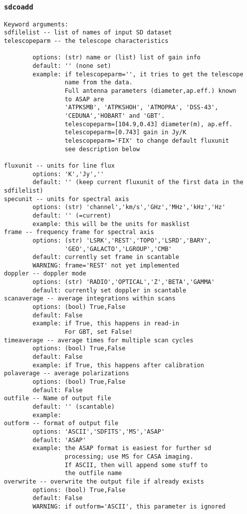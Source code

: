 \subsubsection{{\tt sdcoadd}}
\label{section:sd.sdtasks.tasks.sdcoadd}

\begin{verbatim}
Keyword arguments:
sdfilelist -- list of names of input SD dataset
telescopeparm -- the telescope characteristics

        options: (str) name or (list) list of gain info
        default: '' (none set)
        example: if telescopeparm='', it tries to get the telescope
                 name from the data.
                 Full antenna parameters (diameter,ap.eff.) known
                 to ASAP are
                 'ATPKSMB', 'ATPKSHOH', 'ATMOPRA', 'DSS-43',
                 'CEDUNA','HOBART' and 'GBT'.
                 telescopeparm=[104.9,0.43] diameter(m), ap.eff.
                 telescopeparm=[0.743] gain in Jy/K
                 telescopeparm='FIX' to change default fluxunit
                 see description below

fluxunit -- units for line flux
        options: 'K','Jy',''
        default: '' (keep current fluxunit of the first data in the sdfilelist)
specunit -- units for spectral axis
        options: (str) 'channel','km/s','GHz','MHz','kHz','Hz'
        default: '' (=current)
        example: this will be the units for masklist
frame -- frequency frame for spectral axis
        options: (str) 'LSRK','REST','TOPO','LSRD','BARY',
                 'GEO','GALACTO','LGROUP','CMB'
        default: currently set frame in scantable
        WARNING: frame='REST' not yet implemented
doppler -- doppler mode
        options: (str) 'RADIO','OPTICAL','Z','BETA','GAMMA'
        default: currently set doppler in scantable
scanaverage -- average integrations within scans
        options: (bool) True,False
        default: False
        example: if True, this happens in read-in
                 For GBT, set False!
timeaverage -- average times for multiple scan cycles
        options: (bool) True,False
        default: False
        example: if True, this happens after calibration
polaverage -- average polarizations
        options: (bool) True,False
        default: False
outfile -- Name of output file
        default: '' (scantable)
        example:
outform -- format of output file
        options: 'ASCII','SDFITS','MS','ASAP'
        default: 'ASAP'
        example: the ASAP format is easiest for further sd
                 processing; use MS for CASA imaging.
                 If ASCII, then will append some stuff to
                 the outfile name
overwrite -- overwrite the output file if already exists
        options: (bool) True,False
        default: False
        WARNING: if outform='ASCII', this parameter is ignored
\end{verbatim}

